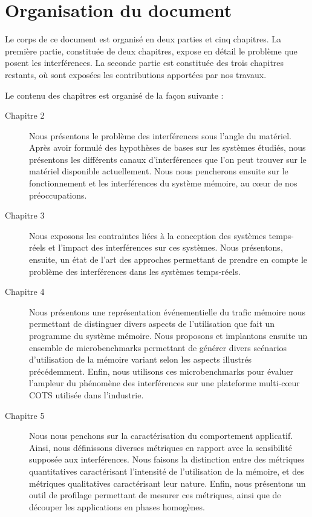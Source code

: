 


\section{Organisation du document}

Le corps de ce document est organisé en deux parties et cinq chapitres.
La première partie, constituée de deux chapitres, expose en détail le problème que posent les interférences.
La seconde partie est constituée des trois chapitres restants, où sont exposées les contributions apportées par nos travaux.

Le contenu des chapitres est organisé de la façon suivante :
\begin{description}
	\item [Chapitre 2] Nous présentons le problème des interférences sous l'angle du matériel.
	Après avoir formulé des hypothèses de bases sur les systèmes étudiés, nous présentons les différents canaux d'interférences que l'on peut trouver sur le matériel disponible actuellement.
	Nous nous pencherons ensuite sur le fonctionnement et les interférences du système mémoire, au cœur de nos préoccupations.

	\item [Chapitre 3] Nous exposons les contraintes liées à la conception des systèmes temps-réels et l'impact des interférences sur ces systèmes.
	Nous présentons, ensuite, un état de l'art des approches permettant de prendre en compte le problème des interférences dans les systèmes temps-réels.

	\item [Chapitre 4] Nous présentons une représentation événementielle du trafic mémoire nous permettant de distinguer divers aspects de l'utilisation que fait un programme du système mémoire.
	Nous proposons et implantons ensuite un ensemble de microbenchmarks permettant de générer divers scénarios d'utilisation de la mémoire variant selon les aspects illustrés précédemment.
	Enfin, nous utilisons ces microbenchmarks pour évaluer l'ampleur du phénomène des interférences sur une plateforme multi-cœur COTS utilisée dans l'industrie.

	\item [Chapitre 5] Nous nous penchons sur la caractérisation du comportement applicatif.
	Ainsi, nous définissons diverses métriques en rapport avec la sensibilité supposée aux interférences.
	Nous faisons la distinction entre des métriques quantitatives caractérisant l'intensité de l'utilisation de la mémoire, et des métriques qualitatives caractérisant leur nature.
	Enfin, nous présentons un outil de profilage permettant de mesurer ces métriques, ainsi que de découper les applications en phases homogènes.


\end{description}
